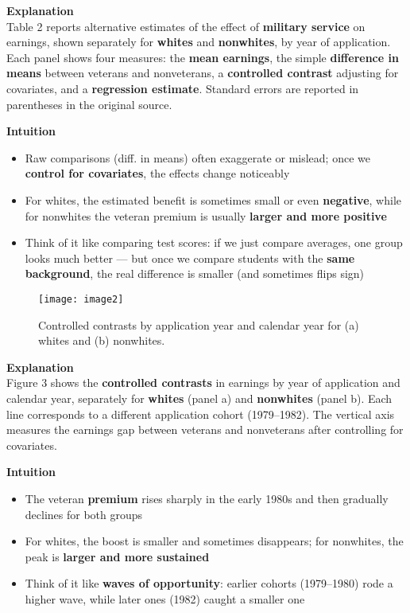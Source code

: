 \documentclass[12pt]{article}
\begin{document}
\doublespacing
\textbf{Explanation} \\
Table 2 reports alternative estimates of the effect of \textbf{military service} on 
earnings, shown separately for \textbf{whites} and \textbf{nonwhites}, by year of application.  
Each panel shows four measures: the \textbf{mean earnings}, the simple 
\textbf{difference in means} between veterans and nonveterans, a 
\textbf{controlled contrast} adjusting for covariates, and a 
\textbf{regression estimate}. Standard errors are reported in parentheses in the original source.

\singlespacing
\textbf{Intuition}
\begin{itemize}
    \item Raw comparisons (diff. in means) often exaggerate or mislead; once we 
    \textbf{control for covariates}, the effects change noticeably
    \item For whites, the estimated benefit is sometimes small or even 
    \textbf{negative}, while for nonwhites the veteran premium is usually 
    \textbf{larger and more positive}
    \item Think of it like comparing test scores: if we just compare averages, 
    one group looks much better — but once we compare students with the 
    \textbf{same background}, the real difference is smaller (and sometimes flips sign)
\end{itemize}

\begin{figure}[H]
\centering
\texttt{[image: image2]}
\caption*{\footnotesize 
Controlled contrasts by application year and calendar year for 
(a) whites and (b) nonwhites.}
\end{figure}

\doublespacing
\textbf{Explanation} \\
Figure 3 shows the \textbf{controlled contrasts} in earnings by year of application and 
calendar year, separately for \textbf{whites} (panel a) and \textbf{nonwhites} (panel b).  
Each line corresponds to a different application cohort (1979--1982).  
The vertical axis measures the earnings gap between veterans and nonveterans after 
controlling for covariates.  

\singlespacing
\textbf{Intuition}
\begin{itemize}
    \item The veteran \textbf{premium} rises sharply in the early 1980s and then 
    gradually declines for both groups
    \item For whites, the boost is smaller and sometimes disappears; for nonwhites, 
    the peak is \textbf{larger and more sustained}
    \item Think of it like \textbf{waves of opportunity}: earlier cohorts (1979--1980) 
    rode a higher wave, while later ones (1982) caught a smaller one
\end{itemize}
\end{document}
